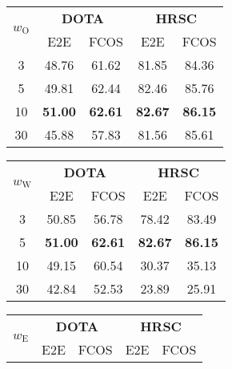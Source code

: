 \begin{table*}[!tb]
\fontsize{8.5pt}{10pt}\selectfont
\setlength{\tabcolsep}{2.08mm}
\setlength{\aboverulesep}{0.4ex}
\setlength{\belowrulesep}{0.4ex}
\setlength{\abovecaptionskip}{1.5mm}
\hspace{1pt}
\begin{minipage}[t]{0.315\linewidth}
\centering
\begin{tabular}{c|cc|cc}
\toprule
\multirow{2}{*}{$w_\text{O}$} & \multicolumn{2}{c|}{\textbf{DOTA}} & \multicolumn{2}{c}{\textbf{HRSC}} \\
                  & {E2E} & {FCOS} & {E2E} & {FCOS} \\ \midrule
3  & 48.76 & 61.62 & 81.85 & 84.36 \\
5  & 49.81 & 62.44 & 82.46 & 85.76 \\
\rowcolor{gray!20} 10 & \textbf{51.00} & \textbf{62.61} & \textbf{82.67} & \textbf{86.15} \\
30 & 45.88 & 57.83 & 81.56 & 85.61 \\
\bottomrule
\end{tabular}
\caption{Ablation with the weight of $\mathcal{L}_\text{O}$.}
\label{tab:abl_lo}
\end{minipage}
\quad
\begin{minipage}[t]{0.315\linewidth}
\centering
\begin{tabular}{c|cc|cc}
\toprule
\multirow{2}{*}{$w_\text{W}$} & \multicolumn{2}{c|}{\textbf{DOTA}} & \multicolumn{2}{c}{\textbf{HRSC}} \\
                  & {E2E} & {FCOS} & {E2E} & {FCOS} \\ \midrule
3  & 50.85 & 56.78 & 78.42 & 83.49 \\
\rowcolor{gray!20} 5  & \textbf{51.00} & \textbf{62.61} & \textbf{82.67} & \textbf{86.15} \\
10 & 49.15 & 60.54 & 30.37 & 35.13 \\
30 & 42.84 & 52.53 & 23.89 & 25.91 \\
\bottomrule
\end{tabular}
\caption{Ablation with the weight of $\mathcal{L}_\text{W}$.}
\label{tab:abl_lw}
\end{minipage}
\quad
\begin{minipage}[t]{0.315\linewidth}
\setlength{\tabcolsep}{2.04mm}
\centering
\begin{tabular}{c|cc|cc}
\toprule
\multirow{2}{*}{$w_\text{E}$} & \multicolumn{2}{c|}{\textbf{DOTA}} & \multicolumn{2}{c}{\textbf{HRSC}} \\
                  & {E2E} & {FCOS} & {E2E} & {FCOS} \\ \midrule

\end{tabular}
\end{minipage}
\end{table*}
